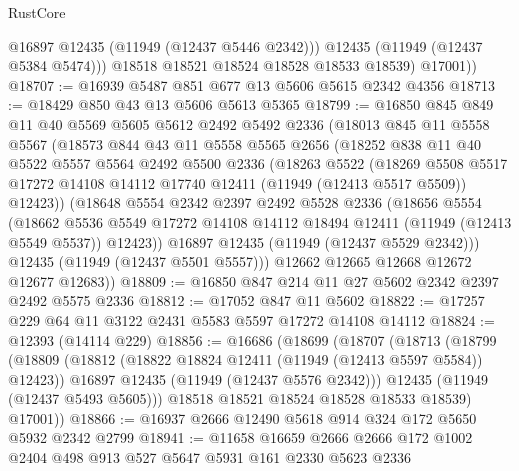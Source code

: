 \begin{lexlean}{RustCore}
\begin{coremodule}
              @16897
              @12435
              (@11949 (@12437 @5446 @2342)))
            @12435
            (@11949 (@12437 @5384 @5474)))
          @18518
          @18521
          @18524
          @18528
          @18533
          @18539)
        @17001))
@18707 := @16939 @5487 @851 @677 @13 @5606 @5615 @2342 @4356
@18713 := @18429 @850 @43 @13 @5606 @5613 @5365
@18799 := @16850
    @845
    @849
    @11
    @40
    @5569
    @5605
    @5612
    @2492
    @5492
    @2336
    (@18013
      @845
      @11
      @5558
      @5567
      (@18573
        @844
        @43
        @11
        @5558
        @5565
        @2656
        (@18252
          @838
          @11
          @40
          @5522
          @5557
          @5564
          @2492
          @5500
          @2336
          (@18263
            @5522
            (@18269
              @5508
              @5517
              @17272
              @14108
              @14112
              @17740
              @12411
              (@11949 (@12413 @5517 @5509))
              @12423))
          (@18648
            @5554
            @2342
            @2397
            @2492
            @5528
            @2336
            (@18656
              @5554
              (@18662
                @5536
                @5549
                @17272
                @14108
                @14112
                @18494
                @12411
                (@11949 (@12413 @5549 @5537))
                @12423))
            @16897
            @12435
            (@11949 (@12437 @5529 @2342)))
          @12435
          (@11949 (@12437 @5501 @5557)))
        @12662
        @12665
        @12668
        @12672
        @12677
        @12683))
@18809 := @16850 @847 @214 @11 @27 @5602 @2342 @2397 @2492 @5575 @2336
@18812 := @17052 @847 @11 @5602
@18822 := @17257 @229 @64 @11 @3122 @2431 @5583 @5597 @17272 @14108 @14112
@18824 := @12393 (@14114 @229)
@18856 := @16686
    (@18699
      (@18707
        (@18713
          (@18799
            (@18809
              (@18812 (@18822 @18824 @12411 (@11949 (@12413 @5597 @5584)) @12423))
              @16897
              @12435
              (@11949 (@12437 @5576 @2342)))
            @12435
            (@11949 (@12437 @5493 @5605)))
          @18518
          @18521
          @18524
          @18528
          @18533
          @18539)
        @17001))
@18866 := @16937 @2666 @12490 @5618 @914 @324 @172 @5650 @5932 @2342 @2799
@18941 := @11658
    @16659
    @2666
    @2666
    @172
    @1002
    @2404
    @498
    @913
    @527
    @5647
    @5931
    @161
    @2330
    @5623
    @2336

\end{coremodule}
\end{lexlean}
